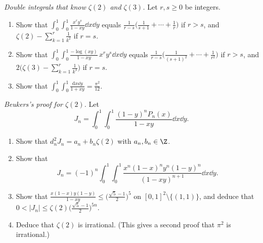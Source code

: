 \begin{exercise}[$\star$]\label{pb:doubleint}
\emph{Double integrals that know $\zeta(2)$ and $\zeta(3)$.} Let $r,s\ge0$ be integers.
\begin{enumerate}[label=(\alph*)]
\item Show that $\displaystyle\int_0^1\!\!\int_0^1\frac{x^ry^s}{1-xy}\dd x\dd y$ equals $\frac1{r-s}\bigl(\frac1{s+1}+\cdots+\frac1r\bigr)$ if $r>s$, and
$\zeta(2)-\sum_{k=1}^r\frac1{k^2}$ if $r=s$.
\item Show that $\displaystyle\int_0^1\!\!\int_0^1\frac{-\log(xy)}{1-xy}\,x^ry^s\dd x\dd y$ equals $\frac1{r-s}\bigl(\frac1{(s+1)^2}+\cdots+\frac1{r^2}\bigr)$ if $r>s$, and
$2\bigl(\zeta(3)-\sum_{k=1}^r\frac1{k^3}\bigr)$ if $r=s$.
\item Show that $\displaystyle\int_0^1\!\!\int_0^1\frac{\mathrm dx\dd y}{1+xy}=\frac{\pi^2}{12}$.
\end{enumerate}
\end{exercise}

\begin{exercise}[$\star\star\star$]\label{pb:beukerstwo}
\emph{Beukers's proof for $\zeta(2)$.} Let
\[
J_n=\int_0^1\!\!\int_0^1\frac{(1-y)^nP_n(x)}{1-xy}\dd x\dd y.
\]
\begin{enumerate}[label=(\alph*)]
\item Show that $d_n^2J_n=a_n+b_n\zeta(2)$ with $a_n,b_n\in\Z$.
\item Show that
\[
J_n=(-1)^n\int_0^1\!\!\int_0^1\frac{x^n(1-x)^ny^n(1-y)^n}{(1-xy)^{n+1}}\dd x\dd y.
\]
\item Show that $\frac{x(1-x)y(1-y)}{1-xy}\le\bigl(\frac{\sqrt5-1}2\bigr)^5$ on $[0,1]^2\setminus\{(1,1)\}$, and deduce that $0<|J_n|\le\zeta(2)\bigl(\frac{\sqrt5-1}2\bigr)^{5n}$.
\item Deduce that $\zeta(2)$ is irrational. (This gives a second proof that $\pi^2$ is irrational.)
\end{enumerate}
\end{exercise}

